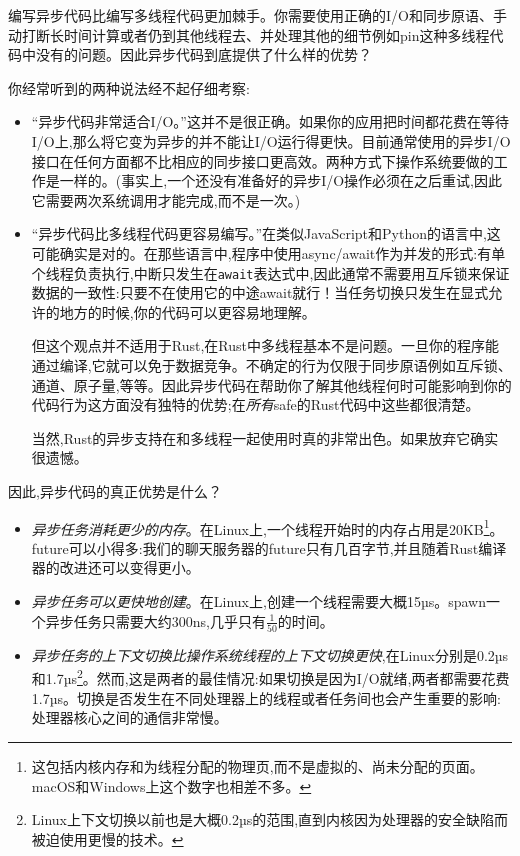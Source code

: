 编写异步代码比编写多线程代码更加棘手。你需要使用正确的I/O和同步原语、手动打断长时间计算或者仍到其他线程去、并处理其他的细节例如pin这种多线程代码中没有的问题。因此异步代码到底提供了什么样的优势？

你经常听到的两种说法经不起仔细考察:
\begin{itemize}
    \item “异步代码非常适合I/O。”这并不是很正确。如果你的应用把时间都花费在等待I/O上,那么将它变为异步的并不能让I/O运行得更快。目前通常使用的异步I/O接口在任何方面都不比相应的同步接口更高效。两种方式下操作系统要做的工作是一样的。(事实上,一个还没有准备好的异步I/O操作必须在之后重试,因此它需要两次系统调用才能完成,而不是一次。)
    \item “异步代码比多线程代码更容易编写。”在类似JavaScript和Python的语言中,这可能确实是对的。在那些语言中,程序中使用async/await作为并发的形式:有单个线程负责执行,中断只发生在\texttt{await}表达式中,因此通常不需要用互斥锁来保证数据的一致性:只要不在使用它的中途await就行！当任务切换只发生在显式允许的地方的时候,你的代码可以更容易地理解。
    
    但这个观点并不适用于Rust,在Rust中多线程基本不是问题。一旦你的程序能通过编译,它就可以免于数据竞争。不确定的行为仅限于同步原语例如互斥锁、通道、原子量,等等。因此异步代码在帮助你了解其他线程何时可能影响到你的代码行为这方面没有独特的优势;在\emph{所有}safe的Rust代码中这些都很清楚。

    当然,Rust的异步支持在和多线程一起使用时真的非常出色。如果放弃它确实很遗憾。
\end{itemize}

因此,异步代码的真正优势是什么？
\begin{itemize}
    \item \emph{异步任务消耗更少的内存}。在Linux上,一个线程开始时的内存占用是20KB\footnote{这包括内核内存和为线程分配的物理页,而不是虚拟的、尚未分配的页面。macOS和Windows上这个数字也相差不多。}。future可以小得多:我们的聊天服务器的future只有几百字节,并且随着Rust编译器的改进还可以变得更小。
    \item \emph{异步任务可以更快地创建}。在Linux上,创建一个线程需要大概15µs。spawn一个异步任务只需要大约300ns,几乎只有$\frac{1}{50}$的时间。
    \item \emph{异步任务的上下文切换比操作系统线程的上下文切换更快},在Linux分别是0.2µs和1.7µs\footnote{Linux上下文切换以前也是大概0.2µs的范围,直到内核因为处理器的安全缺陷而被迫使用更慢的技术。}。然而,这是两者的最佳情况:如果切换是因为I/O就绪,两者都需要花费1.7µs。切换是否发生在不同处理器上的线程或者任务间也会产生重要的影响:处理器核心之间的通信非常慢。
\end{itemize}

